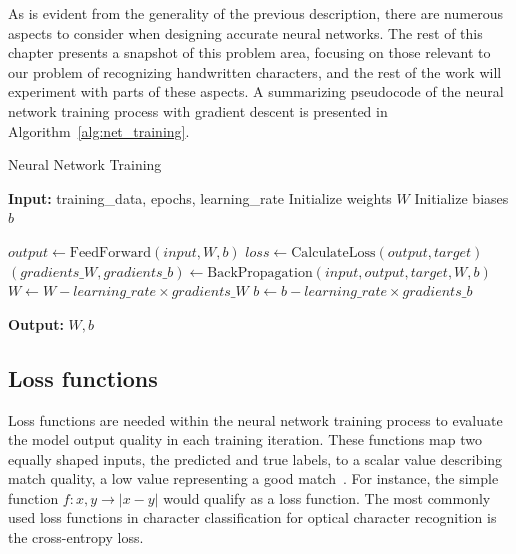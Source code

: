 \documentclass[english,twoside,openright]{UH_DS_MSc}
\begin{document}
As is evident from the generality of the previous description, there are numerous 
aspects to consider when designing accurate neural networks. The 
rest of this chapter presents a snapshot of this problem area, focusing on those 
relevant to our problem of recognizing handwritten characters, and the rest of the 
work will experiment with parts of these aspects. A summarizing pseudocode of the 
neural network training process with gradient descent is presented in Algorithm~\ref{alg:net_training}.

\begin{algorithm}
    \caption{Neural Network Training}
    \begin{algorithmic}[1]
        \State \textbf{Input:} training\_data, epochs, learning\_rate
        \State Initialize weights $W$
        \State Initialize biases $b$
        
                \State $output \gets \text{FeedForward}(input, W, b)$
                \State $loss \gets \text{CalculateLoss}(output, target)$
                \State $(gradients\_W, gradients\_b) \gets \text{BackPropagation}(input, output, target, W, b)$
                \State $W \gets W - learning\_rate \times gradients\_W$
                \State $b \gets b - learning\_rate \times gradients\_b$
            \EndFor
        \EndFor
        
        \State \textbf{Output:} $W, b$  
    \end{algorithmic}
    \label{alg:net_training}
\end{algorithm}

\subsection{Loss functions}
\label{sect:loss_funcs}

Loss functions are needed within the neural network training process to evaluate the model output 
quality in each training iteration. These functions map two equally shaped inputs, the predicted 
and true labels, to a scalar value describing match quality, a low value representing a good match~\cite{princebook}. 
For instance, the simple function $f: x,y \rightarrow |x-y|$  would qualify as a loss function.
The most commonly used loss functions in character classification for optical character recognition is 
the cross-entropy loss.
\end{document}
